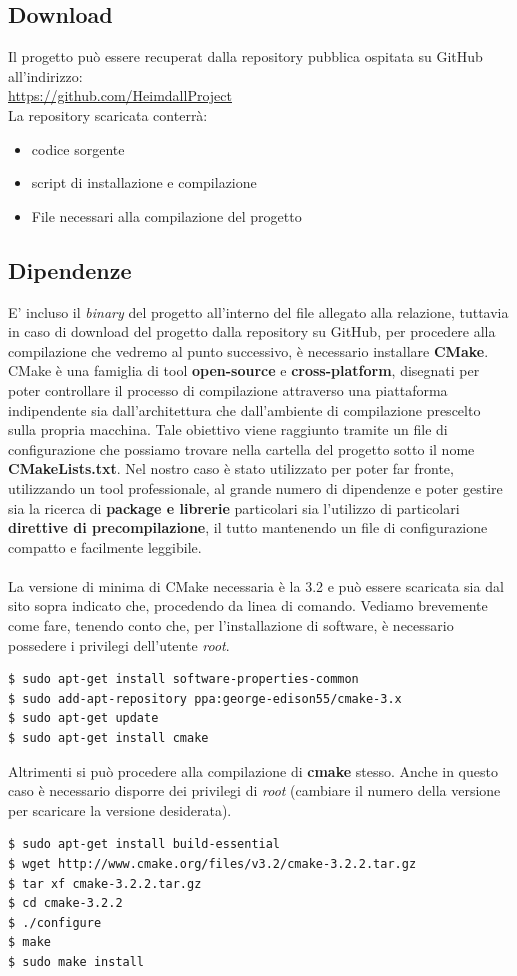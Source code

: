 \documentclass[italian]{tktltiki2}
\begin{document}
\subsection{Download}
Il progetto può essere recuperat dalla repository pubblica ospitata su GitHub all'indirizzo:
\\
\url{https://github.com/HeimdallProject} 
\\
La repository scaricata conterrà:
\begin{itemize}
  \item codice sorgente
  \item script di installazione e compilazione
  \item File necessari alla compilazione del progetto
\end{itemize}
\subsection{Dipendenze}
E' incluso il \emph{binary} del progetto all'interno del file allegato alla relazione, tuttavia in caso di download del progetto dalla repository su GitHub, per procedere alla compilazione che vedremo al punto successivo, è necessario installare \textbf{CMake}.\\
CMake\cite{cmake} è una famiglia di tool \textbf{open-source} e \textbf{cross-platform}, disegnati per poter controllare il processo di compilazione attraverso una piattaforma indipendente sia dall'architettura che dall'ambiente di compilazione prescelto sulla propria macchina. Tale obiettivo viene raggiunto tramite un file di configurazione che possiamo trovare nella cartella del progetto sotto il nome \textbf{CMakeLists.txt}. Nel nostro caso è stato utilizzato per poter far fronte, utilizzando un tool professionale, al grande numero di dipendenze e poter gestire sia la ricerca di \textbf{package e librerie} particolari sia l'utilizzo di particolari \textbf{direttive di precompilazione}, il tutto mantenendo un file di configurazione compatto e facilmente leggibile. \\\\
La versione di minima di CMake necessaria è la 3.2 e può essere scaricata sia dal sito sopra indicato che, procedendo da linea di comando. Vediamo brevemente come fare, tenendo conto che, per l'installazione di software, è necessario possedere i privilegi dell'utente \emph{root}.
\begin{lstlisting}
$ sudo apt-get install software-properties-common
$ sudo add-apt-repository ppa:george-edison55/cmake-3.x
$ sudo apt-get update
$ sudo apt-get install cmake
\end{lstlisting}
Altrimenti si può procedere alla compilazione di \textbf{cmake} stesso. Anche in questo caso è necessario disporre dei privilegi di \emph{root} (cambiare il numero della versione per scaricare la versione desiderata).
\begin{lstlisting}
$ sudo apt-get install build-essential
$ wget http://www.cmake.org/files/v3.2/cmake-3.2.2.tar.gz
$ tar xf cmake-3.2.2.tar.gz
$ cd cmake-3.2.2
$ ./configure
$ make
$ sudo make install
\end{lstlisting}
\end{document}
